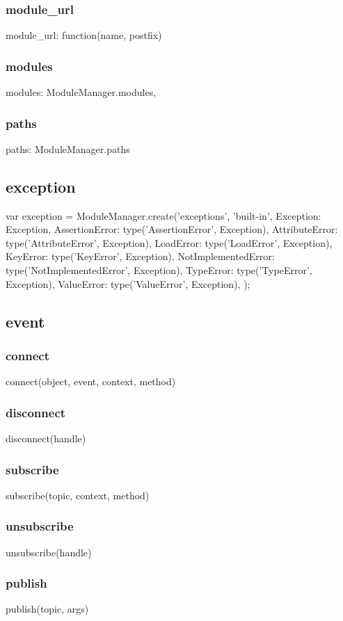 \subsubsection*{module\_url}
module\_url: function(name, postfix) {
\subsubsection*{modules}
modules: ModuleManager.modules,
\subsubsection*{paths}
paths: ModuleManager.paths

\subsection{exception}
var exception = ModuleManager.create('exceptions', 'built-in', {
        Exception: Exception,
        AssertionError: type('AssertionError', Exception),
        AttributeError: type('AttributeError', Exception),
        LoadError: type('LoadError', Exception),
        KeyError: type('KeyError', Exception),
        NotImplementedError: type('NotImplementedError', Exception),
        TypeError: type('TypeError', Exception),
        ValueError: type('ValueError', Exception),
    });

\subsection{event}
\subsubsection*{connect}
connect(object, event, context, method)
\subsubsection*{disconnect}
disconnect(handle)
\subsubsection*{subscribe}
subscribe(topic, context, method)
\subsubsection*{unsubscribe}
unsubscribe(handle)
\subsubsection*{publish}
publish(topic, args)
}
